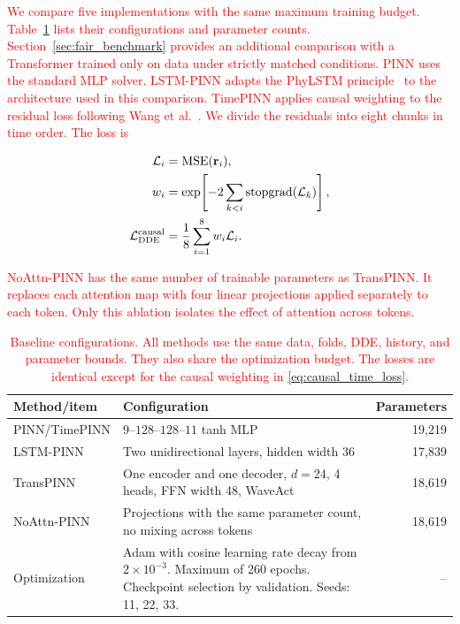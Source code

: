 \documentclass[letterpaper,journal]{IEEEtran}
\begin{document}
	\textcolor{red}{
	We compare five implementations with the same maximum training budget. Table~\ref{tab:architecture} lists their configurations and parameter counts. Section~\ref{sec:fair_benchmark} provides an additional comparison with a Transformer trained only on data under strictly matched conditions.
	PINN uses the standard MLP solver. LSTM-PINN adapts the PhyLSTM principle~\cite{zhang2020phylstm} to the architecture used in this comparison. TimePINN applies causal weighting to the residual loss following Wang et al.~\cite{wang2024causalpinn}. We divide the residuals into eight chunks in time order. The loss is
	}

	\textcolor{red}{
	\begin{equation}
	\begin{aligned}
	\mathcal L_i&=\operatorname{MSE}(\mathbf r_i),\\
	w_i&=\exp\!\left[-2\sum_{k<i}\operatorname{stopgrad}(\mathcal L_k)\right],\\
	\mathcal L_{\rm DDE}^{\rm causal}&=\frac{1}{8}\sum_{i=1}^{8}w_i\mathcal L_i.
	\end{aligned}
	\label{eq:causal_time_loss}
	\end{equation}
	}

	\textcolor{red}{
	NoAttn-PINN has the same number of trainable parameters as TransPINN. It replaces each attention map with four linear projections applied separately to each token. Only this ablation isolates the effect of attention across tokens.
	}

	\begin{table}[t]
		\caption{\textcolor{red}{Baseline configurations. All methods use the same data, folds, DDE, history, and parameter bounds. They also share the optimization budget. The losses are identical except for the causal weighting in \eqref{eq:causal_time_loss}.}}
		\label{tab:architecture}
		\centering\footnotesize
		\begin{tabularx}{\columnwidth}{@{}lXr@{}}
		\toprule
		Method/item & Configuration & Parameters\\
		\midrule
		PINN/TimePINN & $9$--$128$--$128$--$11$ tanh MLP & 19,219\\
		LSTM-PINN & Two unidirectional layers, hidden width 36 & 17,839\\
		TransPINN & One encoder and one decoder, $d=24$, 4 heads, FFN width 48, WaveAct & 18,619\\
		NoAttn-PINN & Projections with the same parameter count, no mixing across tokens & 18,619\\
		Optimization & Adam with cosine learning rate decay from $2\times10^{-3}$. Maximum of 260 epochs. Checkpoint selection by validation. Seeds: 11, 22, 33. & --\\
		\bottomrule
		\end{tabularx}
	\end{table}
\end{document}

